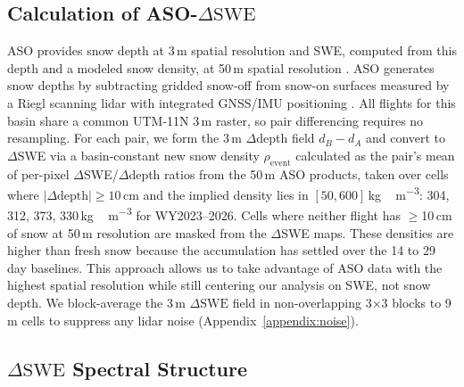 \documentclass[tc, manuscript]{copernicus}
\begin{document}
\subsection{Calculation of ASO-$\Delta\mathrm{SWE}$}\label{subsec:aso-phase}

ASO provides snow depth at 3\,\unit{m} spatial resolution and SWE, computed from this depth and a modeled snow density, at 50\,\unit{m} spatial resolution \citep{Deems2013, Painter2016}. ASO generates snow depths by subtracting gridded snow-off from snow-on surfaces measured by a Riegl scanning lidar with integrated GNSS/IMU positioning \citep{Deems2013, Painter2016}. All flights for this basin share a common UTM-11N 3\,\unit{m} raster, so pair differencing requires no resampling. For each pair, we form the 3\,\unit{m} $\Delta$depth field $d_B - d_A$ and convert to $\Delta$SWE via a basin-constant new snow density $\rho_\mathrm{event}$ calculated as the pair's mean of per-pixel $\Delta$SWE/$\Delta$depth ratios from the 50\,\unit{m} ASO products, taken over cells where $|\Delta\text{depth}|\geq10$\,\unit{cm} and the implied density lies in $[50, 600]$\,\unit{kg\,m^{-3}}: 304, 312, 373, 330\,\unit{kg\,m^{-3}} for WY2023--2026. Cells where neither flight has $\geq$10\,\unit{cm} of snow at 50\,\unit{m} resolution are masked from the $\Delta$SWE maps. These densities are higher than fresh snow because the accumulation has settled over the 14 to 29 day baselines. This approach allows us to take advantage of ASO data with the highest spatial resolution while still centering our analysis on SWE, not snow depth. We block-average the 3\,\unit{m} $\Delta\mathrm{SWE}$ field in non-overlapping 3$\times$3 blocks to 9\,\unit{m} cells to suppress any lidar noise (Appendix~\ref{appendix:noise}).

\subsection{$\Delta\mathrm{SWE}$ Spectral Structure}\label{subsec:psd}
\end{document}
